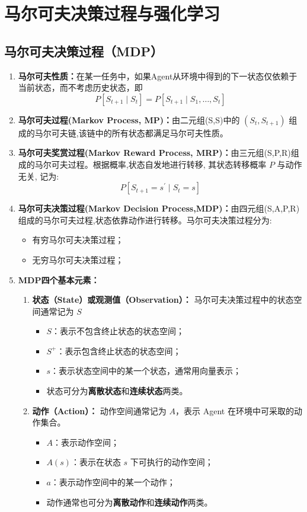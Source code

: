 \documentclass[../main.tex]{subfiles}
\begin{document}
\section{马尔可夫决策过程与强化学习}\label{sec:mdp-rl}
\subsection{马尔可夫决策过程（MDP）}\label{sec:mdp}
\begin{enumerate}
    \item \textbf{马尔可夫性质：}在某一任务中，如果Agent从环境中得到的下一状态仅依赖于当前状态，而不考虑历史状态，即
    $$P\left\lbrack  {{S}_{t + 1} \mid  {S}_{t}}\right\rbrack   = P\left\lbrack  {{S}_{t + 1} \mid  {S}_{1},\ldots ,{S}_{t}}\right\rbrack$$
    \item \textbf{马尔可夫过程(Markov Process, MP)：}由二元组(S,S)中的 $\left( {{S}_{t},{S}_{t + 1}}\right)$ 组成的马尔可夫链,该链中的所有状态都满足马尔可夫性质。
    \item \textbf{马尔可夫奖赏过程(Markov Reward Process, MRP)：}由三元组(S,P,R)组成的马尔可夫过程。根据概率,状态自发地进行转移, 其状态转移概率 $P$ 与动作无关, 记为:
    $$P\left\lbrack  {{S}_{t + 1} = {s}^{\prime } \mid  {S}_{t} = s}\right\rbrack$$
    \item \textbf{马尔可夫决策过程(Markov Decision Process,MDP)：}由四元组(S,A,P,R)组成的马尔可夫过程,状态依靠动作进行转移。马尔可夫决策过程分为:
    \begin{itemize}
        \item 有穷马尔可夫决策过程；
        \item 无穷马尔可夫决策过程；
    \end{itemize}
    \item \textbf{MDP四个基本元素：}
    \begin{enumerate}
        \item \textbf{状态（State）或观测值（Observation）：}
        马尔可夫决策过程中的状态空间通常记为 $S$
        \begin{itemize}
            \item $S$：表示不包含终止状态的状态空间；
            \item $S^+$：表示包含终止状态的状态空间；
            \item $s$：表示状态空间中的某一个状态，通常用向量表示；
            \item 状态可分为\textbf{离散状态}和\textbf{连续状态}两类。
        \end{itemize}

        \item \textbf{动作（Action）：}
        动作空间通常记为 $A$，表示 Agent 在环境中可采取的动作集合。
        \begin{itemize}
            \item $A$：表示动作空间；
            \item $A(s)$：表示在状态 $s$ 下可执行的动作空间；
            \item $a$：表示动作空间中的某一个动作；
            \item 动作通常也可分为\textbf{离散动作}和\textbf{连续动作}两类。
        \end{itemize}


\end{enumerate}
\end{enumerate}
\end{document}
